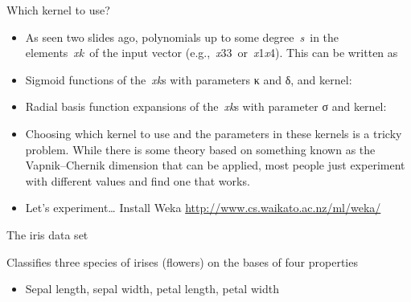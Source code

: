 \documentclass[compress]{beamer}
\begin{document}
\begin{frame}{Which kernel to use?}

\begin{itemize}

\item
  As seen two slides ago, polynomials up to some degree~\emph{s}~in the
  elements~\emph{xk}~of the input vector
  (e.g.,~\emph{x}33~or~\emph{x}1\emph{x}4). This can be written as
\item
  Sigmoid functions of the~\emph{xk}s with parameters κ and δ, and
  kernel:
\item
  Radial basis function expansions of the~\emph{xk}s with parameter σ
  and kernel:
\end{itemize}



\begin{itemize}

\item
  Choosing which kernel to use and the parameters in these kernels is a
  tricky problem. While there is some theory based on something known as
  the Vapnik--Chernik dimension that can be applied, most people just
  experiment with different values and find one that works.
\item
  Let's experiment\ldots{} Install Weka
  \url{http://www.cs.waikato.ac.nz/ml/weka/}
\end{itemize}

\end{frame}

\begin{frame}{The iris data set}

Classifies three species of irises (flowers) on the bases of four
properties

\begin{itemize}

\item
  Sepal length, sepal width, petal length, petal width
\end{itemize}

\end{frame}
\end{document}
